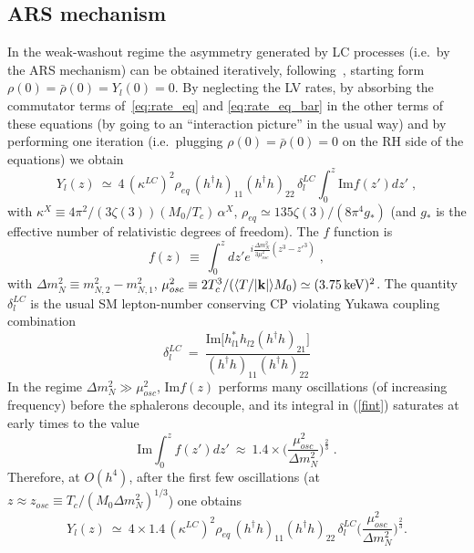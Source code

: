 \documentclass[prd,twocolumn,superscriptaddress,preprintnumbers,nofootinbib,
noshowpacs,groupedaddress]{revtex4-1} %
\newcommand{\ve}[1]{\mathbf{#1}}
\begin{document}
\begin{appendix}
\subsection{ARS mechanism} 
In the weak-washout regime the asymmetry generated by LC processes (i.e.~by the ARS mechanism) can be obtained iteratively, following~\cite{Asaka:2005pn}, starting form $\rho(0) = \bar \rho(0) = Y_l(0) = 0$. By neglecting the LV rates, by absorbing the commutator terms of~\eqref{eq:rate_eq} and \eqref{eq:rate_eq_bar} in the other terms of these equations (by going to an ``interaction picture'' in the usual way) and by performing one iteration (i.e.~plugging $\rho(0) = \bar \rho(0) = 0$ on the RH side of the equations) we obtain
\begin{equation}
Y_l(z) \ \simeq \ 4 \, (\kappa^{LC})^2 \rho_{eq} \, (h^\dag h)_{11} (h^\dag h)_{22} \, \delta_l^{LC} \! \int_0^z \!\! \mathrm{Im} f(z') d z' \;,
\label{fint}
\end{equation}
with $\kappa^{X} \equiv 4 \pi^2/(3 \zeta(3)) (M_0/T_c) \, \alpha^X$,  $\rho_{eq} \simeq 135 \zeta(3)/(8 \pi^4 g_*)$ (and $g_*$ is the effective number of relativistic degrees of freedom). The $f$ function is 
\begin{equation}
f(z) \ \equiv \ \int_0^z \!\! d z' e^{ i \frac{\Delta m_N^2}{3 \mu^2_{osc}}  (z^3 - z'^3)} \;,
\end{equation}
with $\Delta m_N^2 \equiv m_{N,2}^2 - m_{N,1}^2$, $\mu^{2}_{osc} \equiv  2 T_c^3/(\langle T/|\ve k|  \rangle M_0) \simeq (\unit[3.75]{keV})^2$.
The quantity $\delta_l^{LC}$ is the usual SM lepton-number conserving CP violating Yukawa coupling combination
\begin{equation}
\delta^{LC}_l \ = \ \frac{\mathrm{Im}\big[h_{l1}^* h_{l2} (h^\dag h)_{21}\big]}{(h^\dag h)_{11} (h^\dag h)_{22}}
\end{equation}
In the regime $\Delta m_N^2 \gg \mu^2_{osc}$, $\mathrm{Im} f(z)$ performs many oscillations (of increasing frequency) before the sphalerons decouple, and its integral in (\ref{fint}) saturates at early times to the value
\begin{equation}
 \mathrm{Im} \int_0^{z} \!\! f(z') d z' \ \approx \ 1.4 \times \bigg(\frac{\mu^2_{osc}}{\Delta m^2_N}\bigg)^{\frac{2}{3}} \;.
\end{equation}
Therefore, at $O(h^4)$, after the first few oscillations (at $z \approx z_{osc} \equiv T_c/(M_0 \Delta m_N^2)^{1/3}$) one obtains
\begin{equation}
Y_l(z) \ \simeq \ 4 \times 1.4 \,(\kappa^{LC})^2 \rho_{eq} \, (h^\dag h)_{11} (h^\dag h)_{22} \, \delta_l^{LC}\bigg(\frac{\mu^2_{osc}}{\Delta m^2_N}\bigg)^{\frac{2}{3}} \!.

\end{equation}
\end{appendix}
\end{document}
